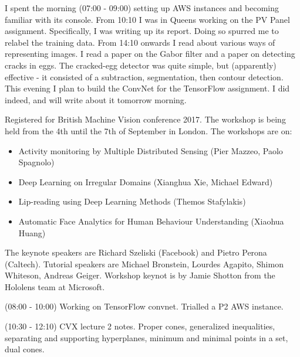 \documentclass[idxtotoc,hyperref,openany]{labbook} %
\begin{document}

I spent the morning (07:00 - 09:00) setting up AWS instances and becoming familiar with its console. From 10:10 I was in Queens working on the PV Panel assignment. Specifically, I was writing up its report. Doing so spurred me to relabel the training data.
From 14:10 onwards I read about various ways of representing images. I read a paper on the Gabor filter and a paper on detecting cracks in eggs. The cracked-egg detector was quite simple, but (apparently) effective - it consisted of a subtraction, segmentation, then contour detection. This evening I plan to build the ConvNet for the TensorFlow assignment. I did indeed, and will write about it tomorrow morning.

Registered for British Machine Vision conference 2017. The workshop  is being held from the 4th until the 7th of September in London. The workshops are on:
\begin{itemize}
	\item Activity monitoring by Multiple Distributed Sensing (Pier Mazzeo, Paolo Spagnolo)
	\item Deep Learning on Irregular Domains (Xianghua Xie, Michael Edward)
	\item Lip-reading using Deep Learning Methods (Themos Stafylakis)
	\item Automatic Face Analytics for Human Behaviour Understanding (Xiaohua Huang)
\end{itemize}
The keynote speakers are Richard Szeliski (Facebook) and Pietro Perona (Caltech). Tutorial speakers are Michael Bronstein, Lourdes Agapito, Shimon Whiteson, Andreas Geiger. Workshop keynot is by Jamie Shotton from the Hololens team at Microsoft.

(08:00 - 10:00) Working on TensorFlow convnet. Trialled a P2 AWS instance.

(10:30 - 12:10) CVX lecture 2 notes. Proper cones, generalized inequalities, separating and supporting hyperplanes, minimum and minimal points in a set, dual cones.
\end{document}
